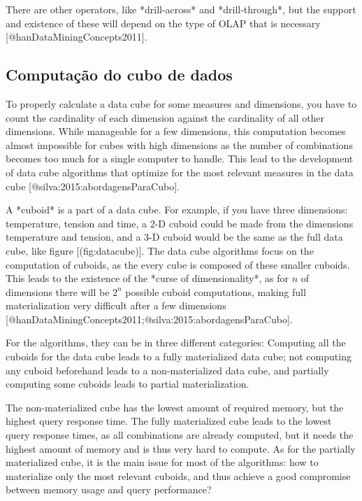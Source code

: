 There are other operators, like *drill-across* and *drill-through*, but the support and existence of these will depend on the type of OLAP that is necessary [@hanDataMiningConcepts2011].

\subsection{Computação do cubo de dados}

To properly calculate a data cube for some measures and dimensions, you have to count the cardinality of each dimension against the cardinality of all other dimensions.
While manageable for a few dimensions, this computation becomes almost impossible for cubes with high dimensions as the number of combinations becomes too much for a single computer to handle.
This lead to the development of data cube algorithms that optimize for the most relevant measures in the data cube [@silva:2015:abordagensParaCubo].

A *cuboid* is a part of a data cube. For example, if you have three dimensions: temperature, tension and time, a 2-D cuboid could be made from the dimensions temperature and tension, and a 3-D cuboid would be the same as the full data cube, like figure [\@ref(fig:datacube)].
The data cube algorithms focus on the computation of cuboids, as the every cube is composed of these smaller cuboids.
This leads to the existence of the *curse of dimensionality*, as for $n$ of dimensions there will be $2^n$ possible cuboid computations, making full materialization very difficult after a few dimensions [@hanDataMiningConcepts2011;@silva:2015:abordagensParaCubo].

For the algorithms, they can be in three different categories: Computing all the cuboids for the data cube leads to a fully materialized data cube; not computing any cuboid beforehand leads to a non-materialized data cube, and partially computing some cuboids leads to partial materialization.

The non-materialized cube has the lowest amount of required memory, but the highest query response time.
The fully materialized cube leads to the lowest query response times, as all combinations are already computed, but it needs the highest amount of memory and is thus very hard to compute.
As for the partially materialized cube, it is the main issue for most of the algorithms: how to materialize only the most relevant cuboids, and thus achieve a good compromise between memory usage and query performance?

